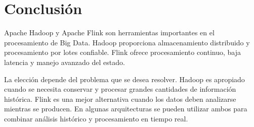 \section{Conclusión}

Apache Hadoop y Apache Flink son herramientas importantes en el procesamiento
de Big Data. Hadoop proporciona almacenamiento distribuido y procesamiento
por lotes confiable. Flink ofrece procesamiento continuo, baja latencia y
manejo avanzado del estado.

La elección depende del problema que se desea resolver. Hadoop es apropiado
cuando se necesita conservar y procesar grandes cantidades de información
histórica. Flink es una mejor alternativa cuando los datos deben analizarse
mientras se producen. En algunas arquitecturas se pueden utilizar ambos para
combinar análisis histórico y procesamiento en tiempo real.